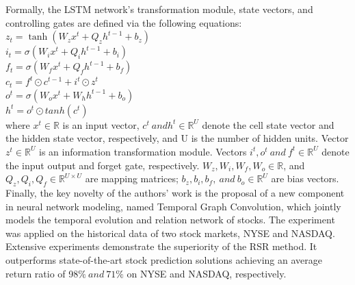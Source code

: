\documentclass[11pt, oneside]{article}   	%
\begin{document}
\begin{Large}
Formally, the LSTM network's transformation module, state vectors, and controlling gates are defined via the following equations:\\

$z_t = \tanh(W_z x^t + Q_z h^{t-1}+b_z)$\\
$i_t = \sigma(W_i x^t+Q_i h^{t-1}+b_i)$\\
$f_t = \sigma(W_f x^t+Q_f h^{t-1}+b_f)$\\
$c_t = f^t \odot c^{t-1} + i^t \odot z^t$\\
$o^t = \sigma(W_o x^t+W_h h^{t-1}+b_o)$\\
$h^t=o^t \odot tanh(c^t)$\\

where $x^t \in \mathbb{R}$ is an input vector, $c^t \ and h^t \in \mathbb{R}^U$ denote the cell state vector and the hidden state vector, respectively, and U is the number of hidden units.  Vector $z^t \in \mathbb{R}^{U}$ is an information transformation module.  Vectors $i^t, o^t \ and \ f^t \in \mathbb{R}^U$ denote the input output and forget gate, respectively. $W_z, W_i, W_f, W_o \in \mathbb{R}$, and $ Q_z, Q_i, Q_f \in \mathbb{R}^{U\times U}$ are mapping matrices; $b_z, b_i, b_f, \ and \ b_o \in \mathbb{R}^U $ are bias vectors.\\


Finally, the key novelty of the authors' work is the proposal of a new component in neural network modeling, named Temporal Graph Convolution, which jointly models the temporal evolution and relation network of stocks.  The experiment was applied on the historical data of two stock markets, NYSE and NASDAQ. Extensive experiments demonstrate the superiority of the RSR method. It outperforms state-of-the-art stock prediction solutions achieving an average return ratio of 98$\% \ and \ 71\%$ on NYSE and NASDAQ, respectively. \\


\end{Large}
\end{document}
